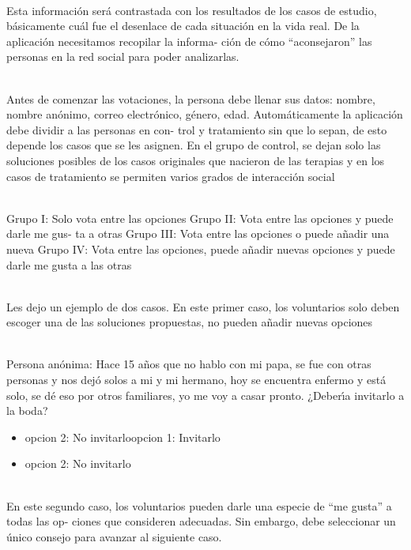 \documentclass[10pt,a4paper]{article} %
\begin{document}
        \\ Esta información será contrastada con los resultados de los casos de estudio, básicamente cuál
        fue el desenlace de cada situación en la vida real. De la aplicación necesitamos recopilar la informa-
        ción de cómo “aconsejaron” las personas en la red social para poder analizarlas.

        \\ Antes de comenzar las votaciones, la persona debe llenar sus datos: nombre, nombre anónimo,
        correo electrónico, género, edad. Automáticamente la aplicación debe dividir a las personas en con-
        trol y tratamiento sin que lo sepan, de esto depende los casos que se les asignen. En el grupo de
        control, se dejan solo las soluciones posibles de los casos originales que nacieron de las terapias y
        en los casos de tratamiento se permiten varios grados de interacción social

        \\Grupo I: Solo vota entre las opciones Grupo II: Vota entre las opciones y puede darle me gus-
        ta a otras Grupo III: Vota entre las opciones o puede añadir una nueva Grupo IV: Vota entre las
        opciones, puede añadir nuevas opciones y puede darle me gusta a las otras

        \\ Les dejo un ejemplo de dos casos. En este primer caso, los voluntarios solo deben escoger una
        de las soluciones propuestas, no pueden añadir nuevas opciones


        \\ Persona anónima: Hace 15 años que no hablo con mi papa, se fue con otras personas y nos dejó
        solos a mi y mi hermano, hoy se encuentra enfermo y está solo, se dé eso por otros familiares, yo
        me voy a casar pronto. ¿Deberı́a invitarlo a la boda?

        \begin{itemize}
            \item { opcion 2: No invitarloopcion 1: Invitarlo}
            \item {opcion 2: No invitarlo}
        \end{itemize}


        \\ En este segundo caso, los voluntarios pueden darle una especie de “me gusta” a todas las op-
        ciones que consideren adecuadas. Sin embargo, debe seleccionar un único consejo para avanzar al
        siguiente caso.
\end{document}

